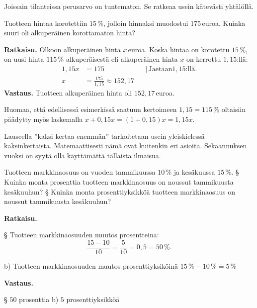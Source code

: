 Joissain tilanteissa perusarvo on tuntematon. Se ratkeaa usein kätevästi yhtälöllä.
\begin{esimerkki}
Tuotteen hintaa korotettiin $15$\,\%, jolloin hinnaksi muodostui $175$\,euroa. Kuinka suuri oli alkuperäinen korottamaton hinta?

\textbf{Ratkaisu.} 
Olkoon alkuperäinen hinta $x$\,euroa. Koska hintaa on korotettu $15$\,\%, on uusi hinta $115$\,\% alkuperäisestä eli alkuperäinen hinta $x$ on kerrottu $1,15$:llä:
\begin{align*}
	1,15x	&= 175	&	&|\, \text{Jaetaan} 1,15\text{:llä}.\\
	x	&= \frac{175}{1,15} \approx 152,17
\end{align*}
    \textbf{Vastaus.}
    Tuotteen alkuperäinen hinta oli $152,17$\,euroa.
\end{esimerkki}

Huomaa, että edellisessä esimerkissä saatuun kertoimeen $1,15 = 115\,\%$ oltaisiin päädytty myös laskemalla $x + 0,15x = (1 + 0,15)x = 1,15x$.

Lauseella ''kaksi kertaa enemmän'' tarkoitetaan usein yleiskielessä kaksinkertaista.
Matemaattisesti nämä ovat kuitenkin eri asioita.
Sekaannuksen vuoksi on syytä olla käyttämättä tällaista ilmaisua.


\begin{esimerkki}
    Tuotteen markkinaosuus on vuoden tammikuussa $10$\,\% ja kesäkuussa $15$\,\%.
    \newline
§ Kuinka monta prosenttia tuotteen markkinaosuus on noussut tammikuusta kesäkuuhun?
    \newline
§ Kuinka monta prosenttiyksikköä tuotteen markkinaosuus on noussut tammikuusta kesäkuuhun?

    \textbf{Ratkaisu.}
    
§ Tuotteen markkinaosuuden muutos prosentteina:
          \[
                \frac{15-10}{10} = \frac{5}{10} = 0,5 = 50\,\%.
          \]
  
b) Tuotteen markkinaosuuden muutos prosenttiyksiköinä $15\,\%-10\,\%=5\,\%$

\textbf{Vastaus.}

§ $50$ prosenttia
b) $5$ prosenttiyksikköä
\end{esimerkki}
